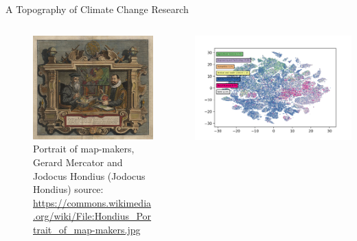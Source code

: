\documentclass[9pt]{beamer}
\begin{document}
\begin{frame}{A Topography of Climate Change Research}
\begin{columns}
	\begin{column}{0.5\linewidth}
		\begin{center}
			\begin{figure}
				\includegraphics[width=1\linewidth]{../plots/Hondius_Portrait_of_map-makers}
				\caption{Portrait of map-makers, Gerard Mercator and Jodocus Hondius (Jodocus Hondius) source: \url{https://commons.wikimedia.org/wiki/File:Hondius_Portrait_of_map-makers.jpg}}
			\end{figure}
		\end{center}
	\end{column}
	\begin{column}{0.5\linewidth}
		\begin{center}
			\includegraphics[width=\linewidth]{../tsne_results/plots/run_662_s_100000_p30_oecds}
		\end{center}
	\end{column}
\end{columns}
\end{frame}
\end{document}
